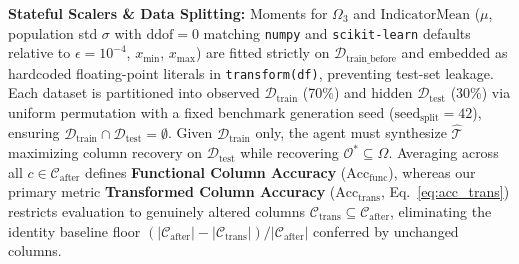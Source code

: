 \documentclass[sigconf]{acmart}
\begin{document}
\noindent\textbf{Stateful Scalers \& Data Splitting:} Moments for $\Omega_3$ and $\text{IndicatorMean}$ ($\mu$, population std $\sigma$ with $\text{ddof}=0$ matching \texttt{numpy} and \texttt{scikit-learn} defaults relative to $\epsilon=10^{-4}$, $x_{\min}$, $x_{\max}$) are fitted strictly on $\mathcal{D}_{\text{train\_before}}$ and embedded as hardcoded floating-point literals in \texttt{transform(df)}, preventing test-set leakage. Each dataset is partitioned into observed $\mathcal{D}_{\text{train}}$ (70\%) and hidden $\mathcal{D}_{\text{test}}$ (30\%) via uniform permutation with a fixed benchmark generation seed ($\text{seed}_{\text{split}}=42$), ensuring $\mathcal{D}_{\text{train}} \cap \mathcal{D}_{\text{test}} = \emptyset$. Given $\mathcal{D}_{\text{train}}$ only, the agent must synthesize $\widehat{\mathcal{T}}$ maximizing column recovery on $\mathcal{D}_{\text{test}}$ while recovering $\mathcal{O}^* \subseteq \Omega$. Averaging across all $c \in \mathcal{C}_{\text{after}}$ defines \textbf{Functional Column Accuracy} ($\text{Acc}_{\text{func}}$), whereas our primary metric \textbf{Transformed Column Accuracy} ($\text{Acc}_{\text{trans}}$, Eq.~\ref{eq:acc_trans}) restricts evaluation to genuinely altered columns $\mathcal{C}_{\text{trans}} \subseteq \mathcal{C}_{\text{after}}$, eliminating the identity baseline floor $(|\mathcal{C}_{\text{after}}| - |\mathcal{C}_{\text{trans}}|)/|\mathcal{C}_{\text{after}}|$ conferred by unchanged columns.
\end{document}
